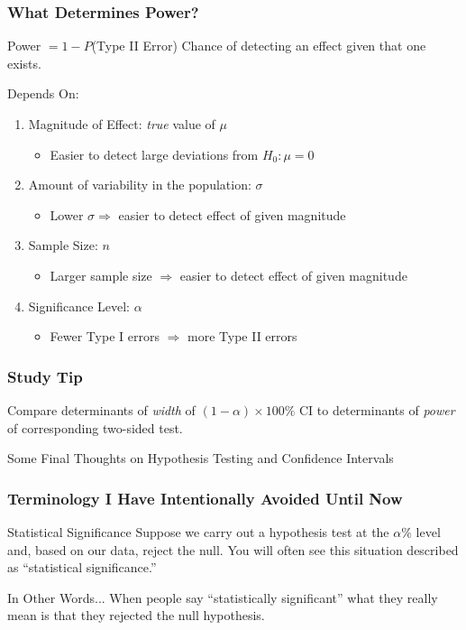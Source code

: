 \documentclass{beamer}
\begin{document}
\begin{frame}
\frametitle{What Determines Power?}
	\begin{block}{Power $ = 1 -  P$(Type II Error)}
Chance of detecting an effect given that one exists.
\end{block}
\begin{block}{Depends On:}
	\begin{enumerate}
\item Magnitude of Effect: \emph{true} value of $\mu$
	\begin{itemize}
		\item Easier to detect large deviations from $H_0\colon \mu = 0$
	\end{itemize}
\item Amount of variability in the population: $\sigma$
	\begin{itemize}
		\item Lower $\sigma \Rightarrow$ easier to detect effect of given magnitude
	\end{itemize}
\item Sample Size: $n$
\begin{itemize}
	\item Larger sample size $\Rightarrow$ easier to detect effect of given magnitude 
\end{itemize}
\item Significance Level: $\alpha$
\begin{itemize}
	\item Fewer Type I errors $\Rightarrow$ more Type II errors
\end{itemize}
\end{enumerate}
\end{block}

\end{frame}

\begin{frame}
\frametitle{Study Tip}
		Compare determinants of \emph{width} of $(1- \alpha)\times100\%$ CI to determinants of \emph{power} of corresponding two-sided test.
\end{frame}
\begin{frame}
\begin{center}
	\huge Some Final Thoughts on Hypothesis Testing and Confidence Intervals
\end{center}
\end{frame}
\begin{frame}
\frametitle{Terminology I Have Intentionally Avoided Until Now}

\begin{block}{Statistical Significance}
Suppose we carry out a hypothesis test at the $\alpha\%$ level and,  based on our data, reject the null. You will often see this situation described as ``statistical significance.''
\end{block}

\begin{block}{In Other Words...}
When people say ``statistically significant'' what they really mean is that they rejected the null hypothesis.
\end{block}
\end{frame}
\end{document}
